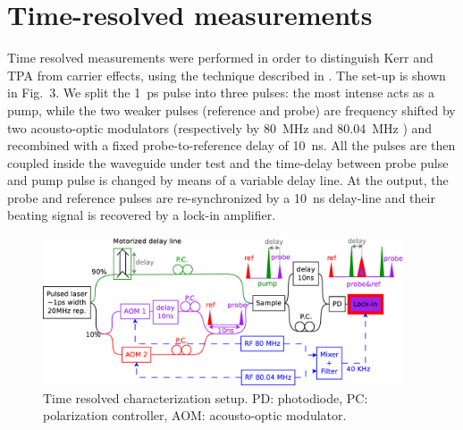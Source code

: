 \documentclass[10pt,letterpaper]{article}
\begin{document}

\section{Time-resolved measurements}
Time resolved measurements were performed in order to distinguish Kerr and TPA from carrier effects, using the technique described in \cite{Vallaitis2008}. The set-up is shown in Fig.~3. We split the 1~ps pulse into three pulses: the most intense acts as a pump, while the two weaker pulses (reference and probe) are frequency shifted by two acousto-optic modulators (respectively by 80~MHz and 80.04~MHz ) and recombined with a fixed probe-to-reference delay of 10~ns. All the pulses are then coupled inside the waveguide under test and the time-delay between probe pulse and pump pulse is changed by means of a variable delay line. At the output, the probe and reference pulses are re-synchronized by a 10~ns delay-line and their beating signal is recovered by a lock-in amplifier.

                                \begin{figure}[htb]
                                         \centering
                                         \includegraphics[width=0.95\textwidth]{timeResolved9}
                                         \caption{Time resolved characterization setup. PD: photodiode, PC: polarization controller, AOM: acousto-optic modulator.}
                                     \label{fig:setupTimeRes}
                                \end{figure}
\end{document}

